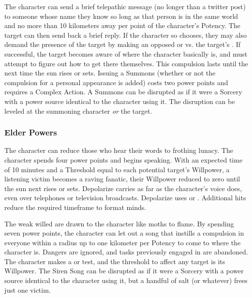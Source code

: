  The character can send a brief telepathic message (no longer than a twitter post) to someone whose name they know so long as that person is in the same world and no more than 10 kilometers away per point of the character's Potency. The target can then send back a brief reply. If the character so chooses, they may also demand the presence of the target by making an opposed  or  vs. the target's . If successful, the target becomes aware of where the character basically is, and must attempt to figure out how to get there themselves. This compulsion lasts until the next time the sun rises or sets. Issuing a Summons (whether or not the compulsion for a personal appearance is added) costs two power points and requires a Complex Action. A Summons can be disrupted as if it were a Sorcery with a power source identical to the character using it. The disruption can be leveled at the summoning character \textit{or} the target.

\subsubsection{Elder Powers}

 The character can reduce those who hear their words to frothing lunacy. The character spends four power points and begins speaking. With an expected time of 10 minutes and a Threshold equal to each potential target's Willpower, a listening victim becomes a raving fanatic, their Willpower reduced to zero until the sun next rises or sets. Depolarize carries as far as the character's voice does, even over telephones or television broadcasts. Depolarize uses  or . Additional hits reduce the required timeframe to format minds.

 The weak willed are drawn to the character like moths to flame. By spending seven power points, the character can let out a song that instills a compulsion in everyone within a radius up to one kilometer per Potency to come to where the character is. Dangers are ignored, and tasks previously engaged in are abandoned. The character makes a  or  test, and the threshold to affect any target is its Willpower. The Siren Song can be disrupted as if it were a Sorcery with a power source identical to the character using it, but a handful of salt (or whatever) frees just one victim.


